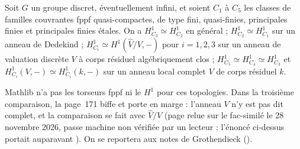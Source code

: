 \begin{encadre}
\begin{theoreme*}\nonverifie
Soit $G$ un groupe discret, éventuellement infini, et soient $C_1$ à $C_5$ les classes de familles couvrantes fppf quasi-compactes, de type fini, quasi-finies, principales finies et principales finies étales. On a $H^1_{C_3} \simeq H^1_{C_2}$ en général ; $H^1_{C_2} \simeq H^1_{C_1}$ sur un anneau de Dedekind ; $H^1_{C_i} \simeq H^1(\hat V/V, -)$ pour $i = 1, 2, 3$ sur un anneau de valuation discrète $V$ à corps résiduel algébriquement clos ; $H^1_{C_5} \simeq H^1_{C_4} \simeq H^1_{C_3}$ et $H^1_{C_i}(V, -) \simeq H^1_{C_i}(k, -)$ sur un anneau local complet $V$ de corps résiduel $k$.
\end{theoreme*}
\end{encadre}
{\small Mathlib n'a pas les torseurs fppf ni le $H^1$ pour ces topologies. Dans la troisième comparaison, la page~171 biffe  et porte en marge  : l'anneau $V$ n'y est pas dit complet, et la comparaison se fait avec $\hat V/V$ (page relue sur le fac-similé le 28 novembre 2026, passe machine non vérifiée par un lecteur ; l'énoncé ci-dessus portait auparavant ). On se reportera aux notes de Grothendieck ().\par}
